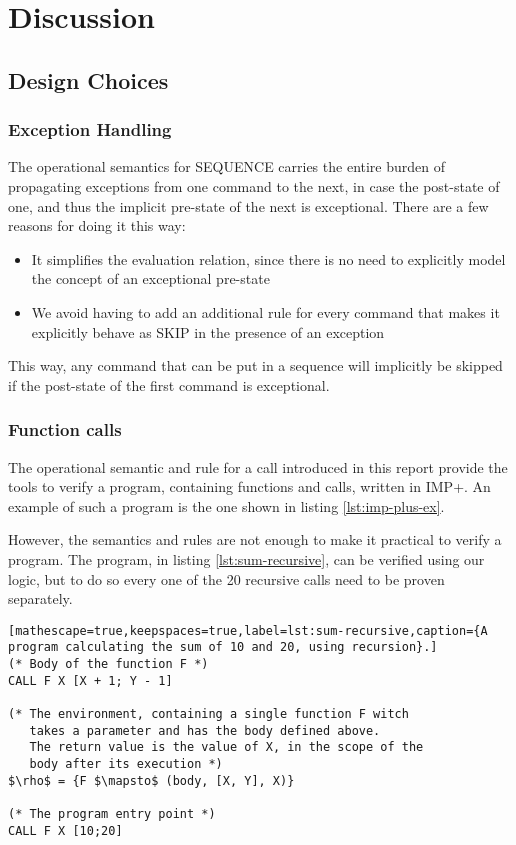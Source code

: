 \section{Discussion}

\subsection{Design Choices}

\subsubsection{Exception Handling}
The operational semantics for SEQUENCE carries the entire burden of propagating exceptions from one command to the next, in case the post-state of one, and thus the implicit pre-state of the next is exceptional. There are a few reasons for doing it this way:

\begin{itemize}
\item It simplifies the evaluation relation, since there is no need to explicitly model the concept of an exceptional pre-state
\item We avoid having to add an additional rule for every command that makes it explicitly behave as SKIP in the presence of an exception
\end{itemize}

This way, any command that can be put in a sequence will implicitly be skipped if the post-state of the first command is exceptional.

\subsubsection{Function calls}
The operational semantic and rule for a call introduced in this report provide the tools to verify a program, containing functions and calls, written in IMP+. An example of such a program is the one shown in listing \ref{lst:imp-plus-ex}.

However, the semantics and rules are not enough to make it practical to verify a program. The program, in listing \ref{lst:sum-recursive}, can be verified using our logic, but to do so every one of the 20 recursive calls need to be proven separately.

\begin{lstlisting}[mathescape=true,keepspaces=true,label=lst:sum-recursive,caption={A program calculating the sum of 10 and 20, using recursion}.]
(* Body of the function F *)
CALL F X [X + 1; Y - 1]

(* The environment, containing a single function F witch
   takes a parameter and has the body defined above.
   The return value is the value of X, in the scope of the 
   body after its execution *)
$\rho$ = {F $\mapsto$ (body, [X, Y], X)}

(* The program entry point *)
CALL F X [10;20]
\end{lstlisting}

